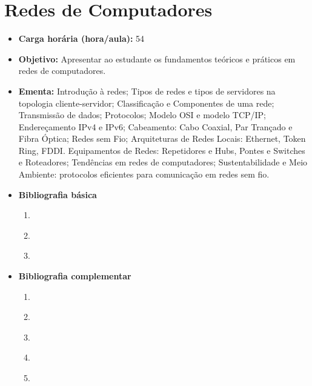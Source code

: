 \documentclass[11pt,fleqn]{book} %
\begin{document}
\section{Redes de Computadores}\label{3_redescomp}
\begin{itemize}
	\item \textbf{Carga horária (hora/aula):} 54
	\item \textbf{Objetivo:} Apresentar ao estudante os fundamentos teóricos e práticos em redes de computadores.
	\item \textbf{Ementa:} 
	Introdução à redes; 
	Tipos de redes e tipos de servidores na topologia cliente-servidor; 
	Classificação e Componentes de uma rede;
	Transmissão de dados;
	Protocolos; 
	Modelo OSI e modelo TCP/IP; 
	Endereçamento IPv4 e IPv6; 
	Cabeamento: Cabo Coaxial, Par Trançado e Fibra Óptica;
	Redes sem Fio;
	Arquiteturas de Redes Locais: Ethernet, Token Ring, FDDI. Equipamentos de Redes: Repetidores e Hubs, Pontes e Switches e Roteadores;
	Tendências em redes de computadores;
	Sustentabilidade e Meio Ambiente: protocolos eficientes para comunicação em redes sem fio.
	\item \textbf{Bibliografia básica}
	\begin{enumerate}
		\item \cite{olsen_2010}
		\item \cite{torres_2014}
		\item \cite{tanembaum_2014}
	\end{enumerate}
	\item \textbf{Bibliografia complementar}
	\begin{enumerate}
		\item \cite{moraes_2010}
		\item \cite{kurose_2013}
		\item \cite{morimoto_2011}
		\item \cite{anderson_2011}
		\item \cite{roxo_2013}
	\end{enumerate}
\end{itemize}

\newpage
\end{document}
